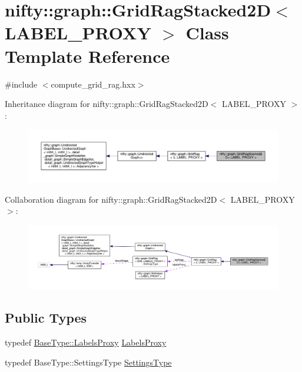 \hypertarget{classnifty_1_1graph_1_1GridRagStacked2D}{}\section{nifty\+:\+:graph\+:\+:Grid\+Rag\+Stacked2D$<$ L\+A\+B\+E\+L\+\_\+\+P\+R\+O\+XY $>$ Class Template Reference}
\label{classnifty_1_1graph_1_1GridRagStacked2D}


{\ttfamily \#include $<$compute\+\_\+grid\+\_\+rag.\+hxx$>$}



Inheritance diagram for nifty\+:\+:graph\+:\+:Grid\+Rag\+Stacked2D$<$ L\+A\+B\+E\+L\+\_\+\+P\+R\+O\+XY $>$\+:
\nopagebreak
\begin{figure}[H]
\begin{center}
\leavevmode
\includegraphics[width=350pt]{classnifty_1_1graph_1_1GridRagStacked2D__inherit__graph}
\end{center}
\end{figure}


Collaboration diagram for nifty\+:\+:graph\+:\+:Grid\+Rag\+Stacked2D$<$ L\+A\+B\+E\+L\+\_\+\+P\+R\+O\+XY $>$\+:
\nopagebreak
\begin{figure}[H]
\begin{center}
\leavevmode
\includegraphics[width=350pt]{classnifty_1_1graph_1_1GridRagStacked2D__coll__graph}
\end{center}
\end{figure}
\subsection*{Public Types}
\begin{DoxyCompactItemize}
\item 
typedef \hyperlink{classnifty_1_1graph_1_1GridRag_ad3146f72301da4f45b51e3b692776cf1}{Base\+Type\+::\+Labels\+Proxy} \hyperlink{classnifty_1_1graph_1_1GridRagStacked2D_a09b44c819b97274a1025dc68cb6b3dc9}{Labels\+Proxy}
\item 
typedef Base\+Type\+::\+Settings\+Type \hyperlink{classnifty_1_1graph_1_1GridRagStacked2D_abc778dc9bd7c20bacba215c1fc64ffb5}{Settings\+Type}
\end{DoxyCompactItemize}
